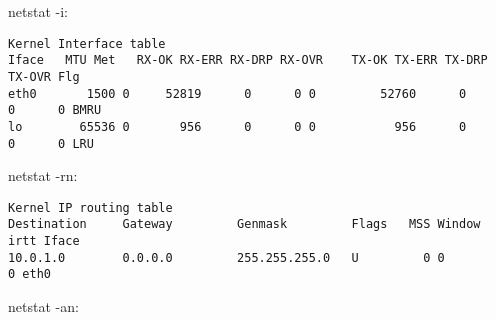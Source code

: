 netstat -i:

\begin{lstlisting}
Kernel Interface table
Iface   MTU Met   RX-OK RX-ERR RX-DRP RX-OVR    TX-OK TX-ERR TX-DRP TX-OVR Flg
eth0       1500 0     52819      0      0 0         52760      0      0      0 BMRU
lo        65536 0       956      0      0 0           956      0      0      0 LRU
\end{lstlisting}




netstat -rn:

\begin{lstlisting}
Kernel IP routing table
Destination     Gateway         Genmask         Flags   MSS Window  irtt Iface
10.0.1.0        0.0.0.0         255.255.255.0   U         0 0          0 eth0
\end{lstlisting}




netstat -an:

